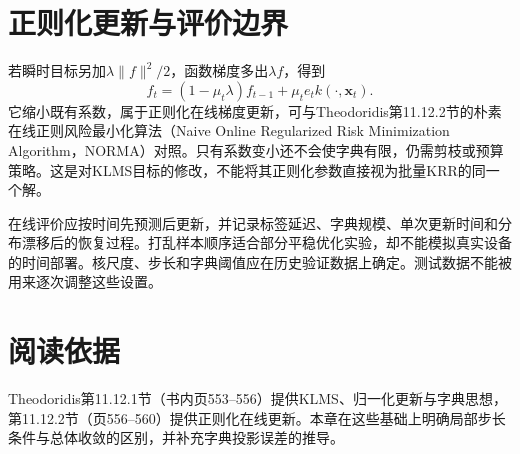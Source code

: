 \section{正则化更新与评价边界}
若瞬时目标另加$\lambda\|f\|^2/2$，函数梯度多出$\lambda f$，得到
\begin{equation}
 f_t=(1-\mu_t\lambda)f_{t-1}+\mu_te_tk(\cdot,\bm x_t).
\end{equation}
它缩小既有系数，属于正则化在线梯度更新，可与Theodoridis第11.12.2节的朴素在线正则风险最小化算法（Naive Online Regularized Risk Minimization Algorithm，NORMA）对照。只有系数变小还不会使字典有限，仍需剪枝或预算策略。这是对KLMS目标的修改，不能将其正则化参数直接视为批量KRR的同一个解。

在线评价应按时间先预测后更新，并记录标签延迟、字典规模、单次更新时间和分布漂移后的恢复过程。打乱样本顺序适合部分平稳优化实验，却不能模拟真实设备的时间部署。核尺度、步长和字典阈值应在历史验证数据上确定。测试数据不能被用来逐次调整这些设置。

\section{阅读依据}
Theodoridis第11.12.1节（书内页553--556）提供KLMS、归一化更新与字典思想，第11.12.2节（页556--560）提供正则化在线更新。本章在这些基础上明确局部步长条件与总体收敛的区别，并补充字典投影误差的推导。
